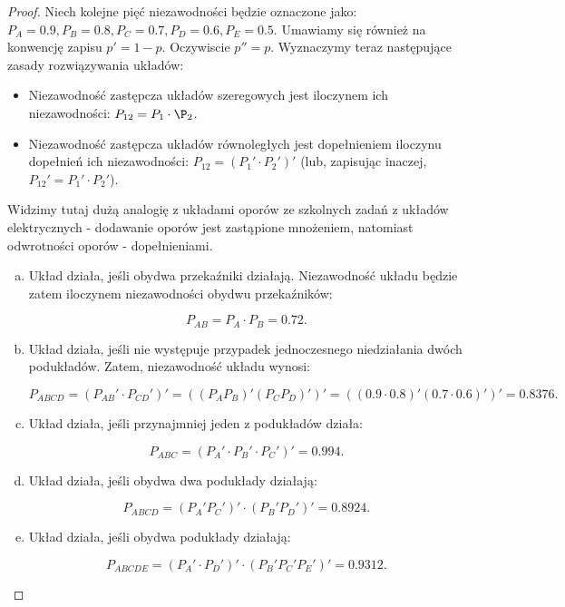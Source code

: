 \documentclass[11pt]{article}
\theoremstyle{definition}
\numberwithin{zadanie}{section}
\begin{document}
\begin{proof}

    Niech kolejne pięć niezawodności będzie oznaczone jako: $P_A=0.9, P_B=0.8, P_C=0.7, P_D=0.6, P_E=0.5$. Umawiamy się również na konwencję zapisu $p' = 1-p$. Oczywiscie $p'' = p$. Wyznaczymy teraz następujące zasady rozwiązywania układów:

    \begin{itemize}
        \item Niezawodność zastępcza układów szeregowych jest iloczynem ich niezawodności: $P_{12} = P_1\cdot\P_2$.
        \item Niezawodność zastępcza układów równoległych jest dopełnieniem iloczynu dopełnień ich niezawodności: $P_{12} = (P_1'\cdot P_2')'$ (lub, zapisując inaczej, $P_{12}' = P_1'\cdot P_2'$).
    \end{itemize}

    Widzimy tutaj dużą analogię z układami oporów ze szkolnych zadań z układów elektrycznych - dodawanie oporów jest zastąpione mnożeniem, natomiast odwrotności oporów - dopełnieniami.

    \begin{enumerate}[a)]
        \item Układ działa, jeśli obydwa przekaźniki działają. Niezawodność układu będzie zatem iloczynem niezawodności obydwu przekaźników:

              $$P_{AB} = P_{A}\cdot P_{B} = 0.72.$$
        \item Układ działa, jeśli nie występuje przypadek jednoczesnego niedziałania dwóch podukładów. Zatem, niezawodność układu wynosi:

              $$P_{ABCD} = (P_{AB}'\cdot P_{CD}')' = ((P_AP_B)'(P_CP_D)')' = ((0.9\cdot 0.8)'(0.7\cdot 0.6)')' = 0.8376.$$

        \item Układ działa, jeśli przynajmniej jeden z podukładów działa:

              $$P_{ABC} = (P_A'\cdot P_B'\cdot P_C')' = 0.994.$$

        \item Układ działa, jeśli obydwa dwa podukłady działają:

              $$P_{ABCD} = (P_A'P_C')'\cdot(P_B'P_D')' = 0.8924.$$

        \item Układ działa, jeśli obydwa podukłady działają:

              $$P_{ABCDE} = (P_A'\cdot P_D')'\cdot(P_B'P_C'P_E')' = 0.9312.$$

    \end{enumerate}
\end{proof}
\end{document}
